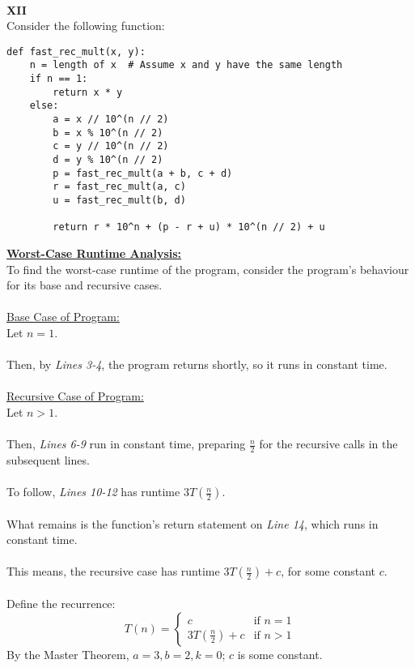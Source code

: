 \documentclass[12pt]{article}
\begin{document}
\leavevmode\\
\textbf{XII} \\
Consider the following function:
\begin{lstlisting}
def fast_rec_mult(x, y):
    n = length of x  # Assume x and y have the same length
    if n == 1:
        return x * y
    else:
        a = x // 10^(n // 2)
        b = x % 10^(n // 2)
        c = y // 10^(n // 2)
        d = y % 10^(n // 2)
        p = fast_rec_mult(a + b, c + d)
        r = fast_rec_mult(a, c)
        u = fast_rec_mult(b, d)

        return r * 10^n + (p - r + u) * 10^(n // 2) + u
\end{lstlisting}
\textbf{\underline{Worst-Case Runtime Analysis:}} \\
To find the worst-case runtime of the program, consider the program's behaviour for its base and recursive cases. \\
\\
\underline{Base Case of Program:} \\
Let $n = 1$. \\
\\
Then, by \textit{Lines 3-4}, the program returns shortly, so it runs in constant time. \\
\\
\underline{Recursive Case of Program:} \\
Let $n > 1$. \\
\\
Then, \textit{Lines 6-9} run in constant time, preparing $\frac{n}{2}$ for the recursive calls in the subsequent lines. \\
\\
To follow, \textit{Lines 10-12} has runtime $3T(\frac{n}{2})$. \\
\\
What remains is the function's return statement on \textit{Line 14}, which runs in constant time. \\
\\
This means, the recursive case has runtime $3T(\frac{n}{2}) + c$, for some constant $c$. \\
\\
Define the recurrence:
\[
    T(n) =
    \begin{cases}
        c & \text{if } n = 1 \\
        3T(\frac{n}{2}) + c & \text{if } n > 1
    \end{cases}
\]
By the Master Theorem, $a = 3, b = 2, k = 0$; $c$ is some constant. \\
\end{document}
